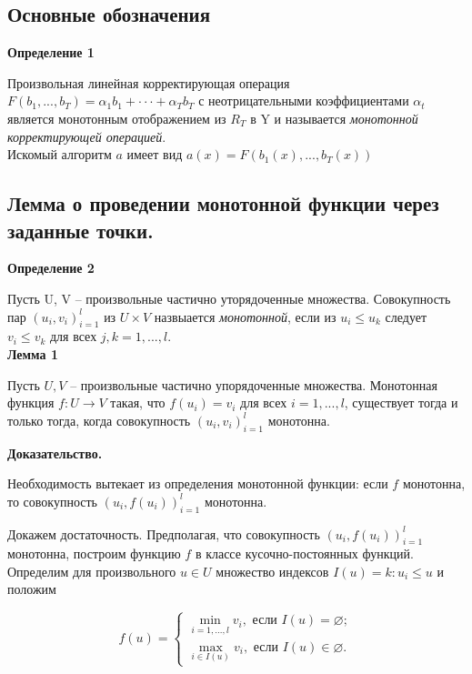\subsection{Основные обозначения} 
 \textbf{Определение 1}
 
 Произвольная линейная корректирующая операция $F(b_1,... , b_T ) = \alpha_1 b_1 + · · · + \alpha_T b_T$ с неотрицательными коэффициентами $\alpha_t$ является монотонным отображением из $R_T$ в Y и называется \textit{монотонной корректирующей операцией}.\\
 
 Искомый алгоритм $a$ имеет вид $a(x) = F(b_1(x), . . . , b_T (x))$
 
\subsection{Лемма о проведении монотонной функции через заданные точки.}
 
 \textbf{Определение 2}
 
 Пусть U, V -- произвольные частично уторядоченные множества. Совокупность пар $(u_i, v_i)_{i=1}^l$ из $U\times V$ назвыается \textit{монотонной}, если из $u_i\leq u_k$ следует $v_i\leq v_k$ для всех $j,k = 1,...,l.$\\
 
 \textbf{Лемма 1}
 
Пусть  $U, V$ -- произвольные частично упорядоченные множества. Монотонная функция $f : U \longrightarrow V$ такая, что $f(u_i) = v_i$ для всех $i = 1, . . . , l$, существует
тогда и только тогда, когда совокупность $(u_i
, v_i)^l_{i=1}$ монотонна.

\textbf{Доказательство.}

Необходимость вытекает из определения монотонной функции: если $f$ монотонна, то совокупность $(u_i,f(u_i))^l_{i=1}$ монотонна.

Докажем достаточность. Предполагая, что совокупность $(u_i,f(u_i))^l_{i=1}$ монотонна,
построим функцию $f$ в классе кусочно-постоянных функций. Определим для произвольного $u \in U $ множество индексов $I(u) = {k : u_i \leq u}$ и положим

\begin{equation*}
    f(u) =
    \begin{cases}
        \min\limits_{i=1,...,l}v_i, \text{ если } I(u) = \varnothing; \\
        \max\limits_{i\in I(u)}v_i, \text{ если } I(u) \in \varnothing .
    \end{cases}
\end{equation*}


